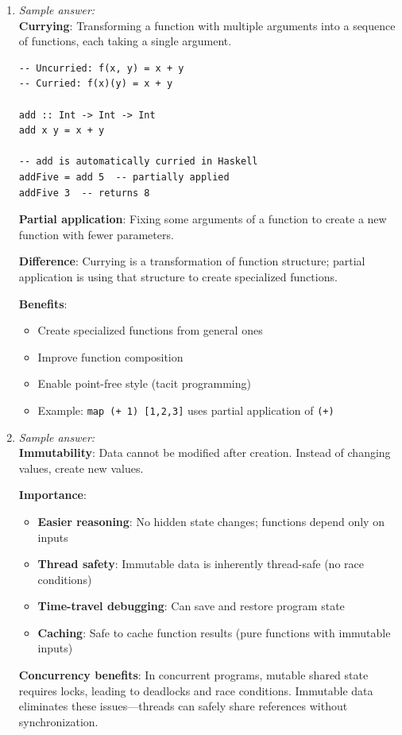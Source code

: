 \documentclass[11pt]{article}
\begin{document}
\begin{enumerate}[label=\textbf{\arabic*.}]
  \item \emph{Sample answer:}\\
  \textbf{Currying}: Transforming a function with multiple arguments into a sequence of functions, 
  each taking a single argument.
\begin{verbatim}
-- Uncurried: f(x, y) = x + y
-- Curried: f(x)(y) = x + y

add :: Int -> Int -> Int
add x y = x + y

-- add is automatically curried in Haskell
addFive = add 5  -- partially applied
addFive 3  -- returns 8
\end{verbatim}

  \textbf{Partial application}: Fixing some arguments of a function to create a new function with 
  fewer parameters.

  \textbf{Difference}: Currying is a transformation of function structure; partial application is 
  using that structure to create specialized functions.

  \textbf{Benefits}:
  \begin{itemize}
    \item Create specialized functions from general ones
    \item Improve function composition
    \item Enable point-free style (tacit programming)
    \item Example: \texttt{map (+ 1) [1,2,3]} uses partial application of \texttt{(+)}
  \end{itemize}

  \item \emph{Sample answer:}\\
  \textbf{Immutability}: Data cannot be modified after creation. Instead of changing values, create 
  new values.

  \textbf{Importance}:
  \begin{itemize}
    \item \textbf{Easier reasoning}: No hidden state changes; functions depend only on inputs
    \item \textbf{Thread safety}: Immutable data is inherently thread-safe (no race conditions)
    \item \textbf{Time-travel debugging}: Can save and restore program state
    \item \textbf{Caching}: Safe to cache function results (pure functions with immutable inputs)
  \end{itemize}

  \textbf{Concurrency benefits}: In concurrent programs, mutable shared state requires locks, leading 
  to deadlocks and race conditions. Immutable data eliminates these issues—threads can safely share 
  references without synchronization.


\end{enumerate}
\end{document}
